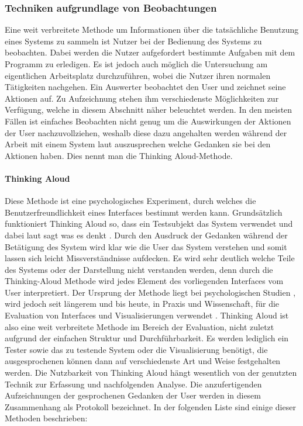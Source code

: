 \documentclass[draft=false
              ,paper=a4
              ,twoside=false
              ,fontsize=11pt
              ,headsepline
              ,BCOR10mm
              ,DIV11
              ]{scrbook}
\begin{document}
\subsubsection{Techniken aufgrundlage von Beobachtungen} %
\label{ssub:techniken_auf_grundlage_von_beobachtungen}
Eine weit verbreitete Methode um Informationen über die tatsächliche Benutzung eines Systems zu sammeln ist Nutzer bei der Bedienung des Systems zu beobachten. Dabei werden die Nutzer aufgefordert bestimmte Aufgaben mit dem Programm zu erledigen. Es ist jedoch auch möglich die Untersuchung am eigentlichen Arbeitsplatz durchzuführen, wobei die Nutzer ihren normalen Tätigkeiten nachgehen. Ein Auswerter beobachtet den User und zeichnet seine Aktionen auf. Zu Aufzeichnung stehen ihm verschiedenste Möglichkeiten zur Verfügung, welche in diesem Abschnitt näher beleuchtet werden. In den meisten Fällen ist einfaches Beobachten nicht genug um die Auswirkungen der Aktionen der User nachzuvollziehen, weshalb diese dazu angehalten werden während der Arbeit mit einem System laut auszusprechen welche Gedanken sie bei den Aktionen haben. Dies nennt man die Thinking Aloud-Methode. 

\paragraph{Thinking Aloud} %
\label{par:thinking_aloud}
Diese Methode ist eine psychologisches Experiment, durch welches die Benutzerfreundlichkeit eines Interfaces bestimmt werden kann. Grundsätzlich funktioniert Thinking Aloud so, dass ein Testsubjekt das System verwendet und dabei laut sagt was es denkt \cite{lewis_using_1982}. Durch den Ausdruck der Gedanken während der Betätigung des System wird klar wie die User das System verstehen und somit lassen sich leicht Missverständnisse aufdecken. Es wird sehr deutlich welche Teile des Systems oder der Darstellung nicht verstanden werden, denn durch die Thinking-Aloud Methode wird jedes Element des vorliegenden Interfaces vom User interpretiert.
Der Ursprung der Methode liegt bei psychologischen Studien \cite{ericsson_verbal_1980}, wird jedoch seit längerem und bis heute, in Praxis und Wissenschaft, für die Evaluation von Interfaces und Visualisierungen verwendet \cite{blascheck_triangulating_2016}\cite{denning_value_1990}. Thinking Aloud ist also eine weit verbreitete Methode im Bereich der Evaluation, nicht zuletzt aufgrund der einfachen Struktur und Durchführbarkeit. Es werden lediglich ein Tester sowie das zu testende System oder die Visualisierung benötigt, die ausgesprochenen können dann auf verschiedenste Art und Weise festgehalten werden. Die Nutzbarkeit von Thinking Aloud hängt wesentlich von der genutzten Technik zur Erfassung und nachfolgenden Analyse. Die anzufertigenden Aufzeichnungen der gesprochenen Gedanken der User werden in diesem Zusammenhang als Protokoll bezeichnet. In der folgenden Liste sind einige dieser Methoden beschrieben:
\end{document}
